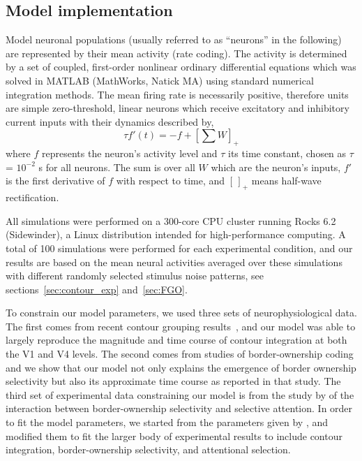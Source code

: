 \subsection{Model implementation}
\label{sec:implementation}

Model neuronal populations (usually referred to as ``neurons'' in the
following) are represented by their mean activity (rate coding).  The
activity is determined by a set of coupled, first-order nonlinear
ordinary differential equations which was solved in MATLAB (MathWorks,
Natick MA) using standard numerical integration methods.  The mean
firing rate is necessarily positive, therefore units are simple
zero-threshold, linear neurons which receive excitatory and inhibitory
current inputs with their dynamics described by,
\begin{equation}
\label{eq:1}
\tau f'(t) = -f + \left[ \sum W \right]_{+}
\end{equation}
where $f$ represents the neuron's activity level and $\tau$ its time
constant, chosen as $\tau$ = $10^{-2}$ s for all neurons. The sum is
over all $W$ which are the neuron's inputs,
$f'$ is the first derivative of $f$ with respect to
time, and $[\,]_{+}$ means half-wave rectification.

All simulations were performed on a 300-core CPU cluster running Rocks
6.2 (Sidewinder), a Linux distribution intended for high-performance
computing.  A total of 100 simulations were performed for each
experimental condition, and our results are based on the mean neural
activities averaged over these simulations with different randomly
selected stimulus noise patterns, see sections~\ref{sec:contour_exp}
and~\ref{sec:FGO}.

To constrain our model parameters, we used three sets of
neurophysiological data. The first comes from recent contour grouping
results~\citep{Chen_etal14}, and our model was able to largely
reproduce the magnitude and time course of contour integration at both
the V1 and V4 levels. The second comes from studies of border-ownership coding
\citep{Zhou_etal00} and we show that our model not only explains the
emergence of border ownership selectivity but also its approximate
time course as reported in that study. The third set of experimental data
constraining our model is from the study by \cite{Qiu_etal07} of the
interaction between border-ownership selectivity and selective
attention. In order to fit the model
parameters, we started from the parameters given by
\cite{Mihalas_etal11b}, and modified them to fit the larger body of
experimental results to include contour integration, border-ownership
selectivity, and attentional selection.

